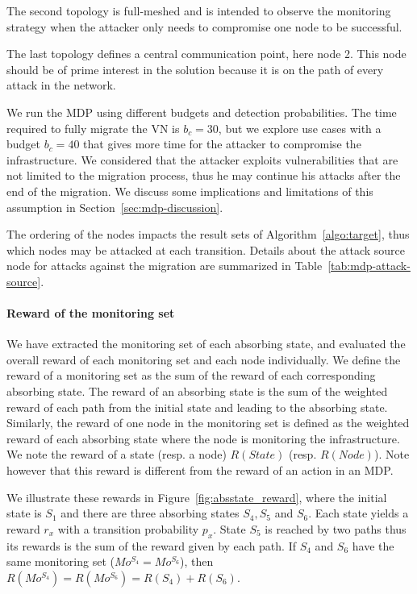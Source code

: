 The second topology is full-meshed and is intended to observe the monitoring strategy when the attacker only needs to compromise one node to be successful.

 The last topology defines a central communication point, here node 2. This node should be of prime interest in the solution because it is on the path of every attack in the network.



We run the MDP using different budgets and detection probabilities.
The time required to fully migrate the VN is $b_c=30$, but we explore use cases with a budget $b_c=40$ that gives more time for the attacker to compromise the infrastructure. We considered that the attacker exploits vulnerabilities that are not limited to the migration process, thus he may continue his attacks after the end of the migration. We discuss some implications and limitations of this assumption in Section~\ref{sec:mdp-discussion}.

The ordering of the nodes impacts the result sets of Algorithm~\ref{algo:target}, thus which nodes may be attacked at each transition.
Details about the attack source node for attacks against the migration are summarized in Table~\ref{tab:mdp-attack-source}.



\paragraph{Reward of the monitoring set}
We have extracted the monitoring set of each absorbing state, and evaluated the overall reward of each monitoring set and each node individually.
We define the reward of a monitoring set as the sum of the reward of each corresponding absorbing state.
The reward of an absorbing state is the sum of the weighted reward of each path from the initial state and leading to the absorbing state. Similarly, the reward of one node in the monitoring set is defined as the weighted reward of each absorbing state where the node is monitoring the infrastructure.
We note the reward of a state (resp. a node) $R(State)$ (resp. $R(Node)$). Note however that this reward is different from the reward of an action in an MDP.

We illustrate these rewards in Figure~\ref{fig:absstate_reward}, where the initial state is $S_1$ and there are three absorbing states $S_4,S_5$ and $S_6$. Each state yields a reward $r_x$ with a transition probability $p_x$.
State $S_5$ is reached by two paths thus its rewards is the sum of the reward given by each path.
If $S_4$ and $S_6$ have the same monitoring set (\ie $Mo^{S_4} = Mo^{S_6}$), then $R(Mo^{S_4}) = R(Mo^{S_6}) = R(S_4) + R(S_6)$.


